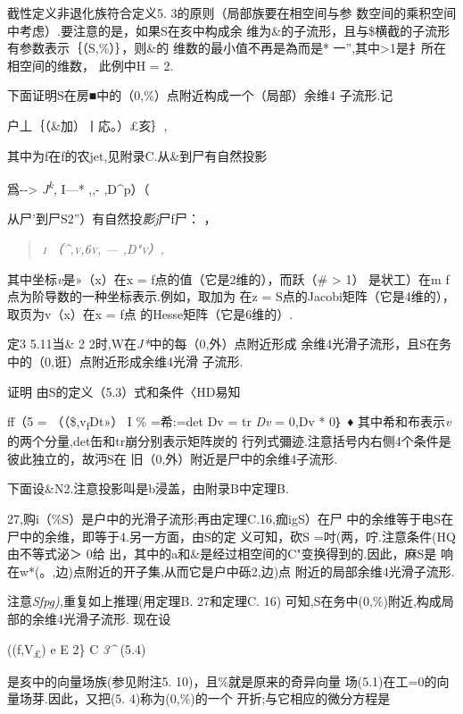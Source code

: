\documentclass{article}
\begin{document}
截性定义非退化族符合定义5. 3的原则（局部族要在相空间与参
数空间的乘积空间中考虑）.要注意的是，如果S在亥中构成余
维为\&的子流形，且与\$横截的子流形有参数表示｛（S,\%）｝，则\&的
维数的最小值不再是為而是* 一'',其中\textgreater{}1是扌所在相空间的维数，
此例中H = 2.

下面证明S在房■中的（0,\%）点附近构成一个（局部）余维4 子流形.记

户丄｛（\&加）丨応。）£亥｝,

其中为f在f的农jet,见附录C.从\&到尸有自然投影

爲-\/-\textgreater{} \emph{J\textsuperscript{k},} I---* ,,- ,D\^{}p）（

从尸'到尸S2''）有自然投\emph{影j}尸f尸： ，

\begin{quote}
\emph{\textsc{i （\^{},v,6v, --- ,D"v）,}}
\end{quote}

其中坐标\emph{v}是»（x）在x = f点的值（它是2维的），而跃（\#
\textgreater{} 1） 是状工）在m f点为阶导数的一种坐标表示.例如，取加为
在z = S点的Jacobi矩阵（它是4维的），取页为v（x）在x = f点
的Hesse矩阵（它是6维的）.

定3 5.11当\& 2 2时,W在\emph{J*}中的每（0,外）点附近形成
余维4光滑子流形，且S在务中的（0,诳）点附近形成余维4光滑 子流形.

证明 由S的定义（5.3）式和条件〈HD易知

ff（5 = （（\$,v\textsubscript{f}Dt»） I \% =希:=det Dv = tr \emph{Dv} =
0,Dv * 0｝ ♦
其中希和布表示\emph{v}的两个分量,det缶和tr崩分别表示矩阵炭的
行列式彌迹.注意括号内右侧4个条件是彼此独立的，故沔S在
旧（0,外）附近是尸中的余维4子流形.

下面设\&N2.注意投影叫是b浸盖，由附录B中定理B.

27,购i（\%S）是户中的光滑子流形;再由定理C.16,痂igS）在尸
中的余维等于电S在尸中的余维，即等于4.另一方面，由S的定 义可知，砍S
=吋(两，\textbar{}咛.注意条件(HQ由不等式泌＞ 0给
出，其中的a和\&是经过相空间的C"变换得到的.因此，麻S是
响在w*(。,边)点附近的开子集,从而它是户中砾2,边)点
附近的局部余维4光滑子流形.

注意\emph{Sfpg),}重复如上推理(用定理B. 27和定理C. 16)
可知,S在务中(0,\%)附近,构成局部的余维4光滑子流形.\textbar{} 现在设

((f,V\textsubscript{£}) \textbar{} e E 2\} C \emph{3\^{}} (5.4)

是亥中的向量场族(参见附注5. 10)，且\%就是原来的奇异向量
场(5.1)在工=0的向量场芽.因此，又把(5. 4)称为(0,\%)的一个
开折;与它相应的微分方程是
\end{document}
